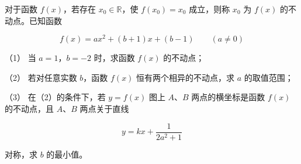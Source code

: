 \begin{question}
对于函数 $f(x)$，若存在 $x_0\in\mathbb R$，使 $f(x_0)=x_0$ 成立，则称 $x_0$ 为 $f(x)$ 的不动点。已知函数

\nopagebreak[4]
\[
f(x)=ax^2+(b+1)x+(b-1)\qquad(a\ne0)
\]

（1） 当 $a=1$，$b=-2$ 时，求函数 $f(x)$ 的不动点；

（2） 若对任意实数 $b$，函数 $f(x)$ 恒有两个相异的不动点，求 $a$ 的取值范围；

（3） 在（2）的条件下，若 $y=f(x)$ 图上 $A\text{、}B$ 两点的横坐标是函数 $f(x)$ 的不动点，且 $A\text{、}B$ 两点关于直线

\nopagebreak[4]
\[
y=kx+\frac1{2a^2+1}
\]

对称，求 $b$ 的最小值。

\end{question}